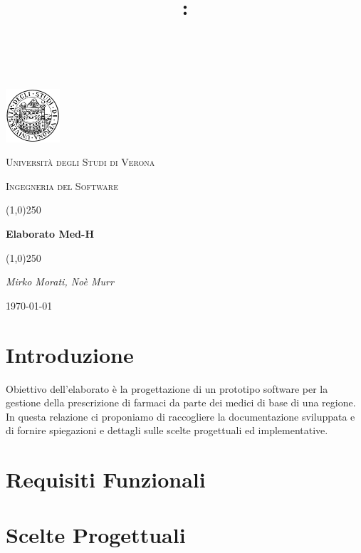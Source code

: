 \documentclass[a4paper]{article}
\title{
	\vspace{2in}
	\textmd{\textbf{\hmwkClass:\\ \hmwkTitle}}\\
	\vspace{0.1in}\large{\textit{\hmwkAuthorName}}
	\vspace{3in}
}
\begin{document}
	\clearpage
\begin{titlepage}
	\centering
	\vspace*{\fill}
	\includegraphics[width=0.15\textwidth]{logo.png}\par\vspace{1cm}
	{\scshape\LARGE Università degli Studi di Verona \par}
	\vspace{1cm}
	{\scshape\Large Ingegneria del Software\par}
	\vspace{1.5cm}
	\line(1,0){250} \\
	{\huge\bfseries Elaborato Med-H\par}
	\line(1,0){250} \\
	\vspace{2cm}
	{\Large\itshape Mirko Morati, Noè Murr\par}
	\vspace{5cm}
	\vspace*{\fill}
	{\large \today\par}
\end{titlepage}
\thispagestyle{empty}
\newpage
\tableofcontents
\newpage

\section{Introduzione}
Obiettivo dell'elaborato è la progettazione di un prototipo software per la gestione della prescrizione di farmaci da parte dei medici di base di una regione.
In questa relazione ci proponiamo di raccogliere la documentazione sviluppata e di fornire spiegazioni e dettagli sulle scelte progettuali ed implementative. 

\section{Requisiti Funzionali}

\section{Scelte Progettuali}
\end{document}
